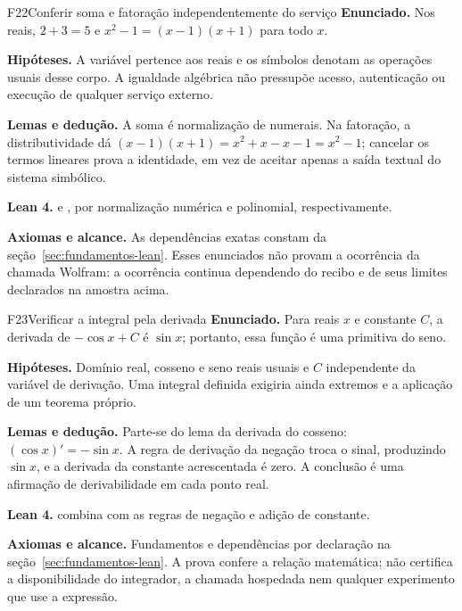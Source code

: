 \begin{formalizacao}{F22}{Conferir soma e fatoração independentemente do serviço}
\textbf{Enunciado.} Nos reais, $2+3=5$ e
$x^2-1=(x-1)(x+1)$ para todo $x$.

\textbf{Hipóteses.} A variável pertence aos reais e os símbolos denotam as
operações usuais desse corpo. A igualdade algébrica não pressupõe acesso,
autenticação ou execução de qualquer serviço externo.

\textbf{Lemas e dedução.} A soma é normalização de numerais. Na fatoração,
a distributividade dá $(x-1)(x+1)=x^2+x-x-1=x^2-1$; cancelar os termos
lineares prova a identidade, em vez de aceitar apenas a saída textual do
sistema simbólico.

\textbf{Lean 4.}  e
, por
normalização numérica e polinomial, respectivamente.

\textbf{Axiomas e alcance.} As dependências exatas constam da
seção~\ref{sec:fundamentos-lean}. Esses enunciados não provam a ocorrência
da chamada Wolfram: a ocorrência continua dependendo do recibo e de seus
limites declarados na amostra acima.
\end{formalizacao}

\begin{formalizacao}{F23}{Verificar a integral pela derivada}
\textbf{Enunciado.} Para reais $x$ e constante $C$, a derivada de
$-\cos x+C$ é $\sin x$; portanto, essa função é uma primitiva do seno.

\textbf{Hipóteses.} Domínio real, cosseno e seno reais usuais e $C$
independente da variável de derivação. Uma integral definida exigiria ainda
extremos e a aplicação de um teorema próprio.

\textbf{Lemas e dedução.} Parte-se do lema da derivada do cosseno:
$(\cos x)'=-\sin x$. A regra de derivação da negação troca o sinal,
produzindo $\sin x$, e a derivada da constante acrescentada é zero.
A conclusão é uma afirmação de derivabilidade em cada ponto real.

\textbf{Lean 4.}  combina
 com as regras de negação e adição de constante.

\textbf{Axiomas e alcance.} Fundamentos e dependências por declaração na
seção~\ref{sec:fundamentos-lean}. A prova confere a relação matemática;
não certifica a disponibilidade do integrador, a chamada hospedada nem
qualquer experimento que use a expressão.
\end{formalizacao}

